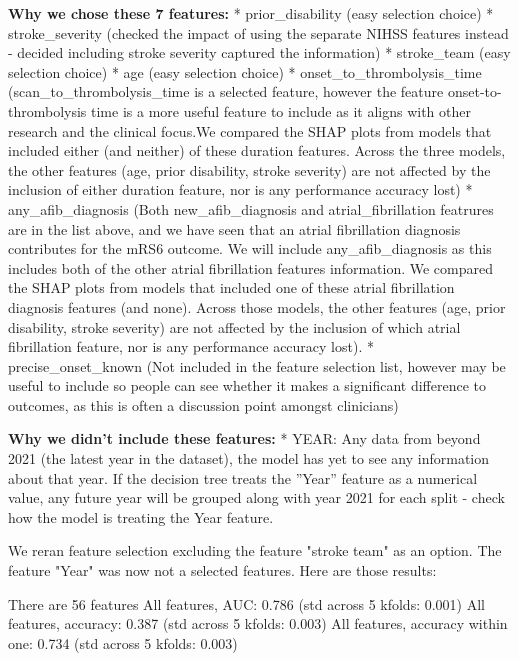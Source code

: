\textbf{Why we chose these 7 features:}
* prior\_disability (easy selection choice)
* stroke\_severity (checked the impact of using the separate NIHSS features instead - decided including stroke severity captured the information)
* stroke\_team (easy selection choice)
* age (easy selection choice)
* onset\_to\_thrombolysis\_time (scan\_to\_thrombolysis\_time is a selected feature, however the feature onset-to-thrombolysis time is a more useful feature to include as it aligns with other research and the clinical focus.We compared the SHAP plots from models that included either (and neither) of these duration features. Across the three models, the other features (age, prior disability, stroke severity) are not affected by the inclusion of either duration feature, nor is any performance accuracy lost)
* any\_afib\_diagnosis (Both new\_afib\_diagnosis and atrial\_fibrillation featrures are in the list above, and we have seen that an atrial fibrillation diagnosis contributes for the mRS6 outcome. We will include any\_afib\_diagnosis as this includes both of the other atrial fibrillation features information. We compared the SHAP plots from models that included one of these atrial fibrillation diagnosis features (and none). Across those models, the other features (age, prior disability, stroke severity) are not affected by the inclusion of which atrial fibrillation feature, nor is any performance accuracy lost).
* precise\_onset\_known (Not included in the feature selection list, however may be useful to include so people can see whether it makes a significant difference to outcomes, as this is often a discussion point amongst clinicians)

\textbf{Why we didn't include these features:}
* YEAR: Any data from beyond 2021 (the latest year in the dataset), the model has yet to see any information about that year. If the decision tree treats the ”Year” feature as a numerical value, any future year will be grouped along with year 2021 for each split - check how the model is treating the Year feature.

We reran feature selection excluding the feature "stroke team" as an option. The feature "Year" was now not a selected features. Here are those results:

There are 56 features
All features, AUC: 0.786 (std across 5 kfolds: 0.001)
All features, accuracy: 0.387 (std across 5 kfolds: 0.003)
All features, accuracy within one: 0.734 (std across 5 kfolds: 0.003)

